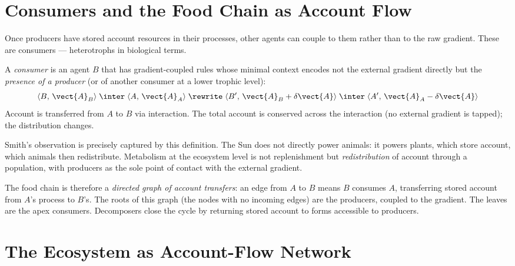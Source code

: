 \section{Consumers and the Food Chain as Account Flow}

Once producers have stored account resources in their processes,
other agents can couple to them rather than to the raw gradient.
These are consumers --- heterotrophs in biological terms.

\begin{definition}[Consumer]
A \emph{consumer} is an agent $B$ that has gradient-coupled
rules whose minimal context encodes not the external gradient
directly but the \emph{presence of a producer} (or of another
consumer at a lower trophic level):
\[
  \langle B,\, \vect{A}_B \rangle \;\inter\;
  \langle A,\, \vect{A}_A \rangle
  \;\rewrite\;
  \langle B',\, \vect{A}_B + \delta\vect{A} \rangle \;\inter\;
  \langle A',\, \vect{A}_A - \delta\vect{A} \rangle
\]
Account is transferred from $A$ to $B$ via interaction.
The total account is conserved across the interaction (no external
gradient is tapped); the distribution changes.
\end{definition}

\begin{remark}
Smith's observation is precisely captured by this definition.
The Sun does not directly power animals: it powers plants, which
store account, which animals then redistribute.
Metabolism at the ecosystem level is not replenishment but
\emph{redistribution} of account through a population, with
producers as the sole point of contact with the external gradient.

The food chain is therefore a \emph{directed graph of account
transfers}: an edge from $A$ to $B$ means $B$ consumes $A$,
transferring stored account from $A$'s process to $B$'s.
The roots of this graph (the nodes with no incoming edges) are
the producers, coupled to the gradient.
The leaves are the apex consumers.
Decomposers close the cycle by returning stored account to
forms accessible to producers.
\end{remark}

\section{The Ecosystem as Account-Flow Network}

